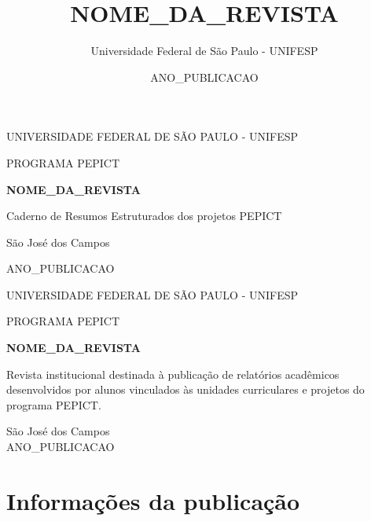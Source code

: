 \documentclass[12pt,openright,oneside,a4paper]{report}
\title{NOME_DA_REVISTA}
\author{Universidade Federal de São Paulo - UNIFESP}
\date{ANO_PUBLICACAO}
\begin{document}
\begin{titlepage}
    \centering
    \vspace*{2cm}
    {\Large UNIVERSIDADE FEDERAL DE SÃO PAULO - UNIFESP \par}
    \vspace{0.5cm}
    {\large PROGRAMA PEPICT \par}
    \vfill
    {\bfseries\LARGE NOME_DA_REVISTA \par}
    \vspace{1cm}
    {\large Caderno de Resumos Estruturados dos projetos PEPICT\par}
    \vfill
    {\large São José dos Campos\par}
    {\large ANO_PUBLICACAO \par}
\end{titlepage}

\begin{titlepage}
    \centering
    {\Large UNIVERSIDADE FEDERAL DE SÃO PAULO - UNIFESP \par}
    \vspace{0.5cm}
    {\large PROGRAMA PEPICT \par}
    \vspace{4cm}
    {\bfseries\LARGE NOME_DA_REVISTA \par}
    \vspace{2cm}
    \hspace{.45\textwidth}
    \begin{minipage}{.5\textwidth}
        \onehalfspacing
        Revista institucional destinada à publicação de relatórios acadêmicos desenvolvidos por alunos vinculados às unidades curriculares e projetos do programa PEPICT.
    \end{minipage}
    \vfill
    \begin{center}
        São José dos Campos \\
        ANO_PUBLICACAO
    \end{center}
\end{titlepage}

\chapter*{Informações da publicação}
\thispagestyle{empty}
\end{document}
